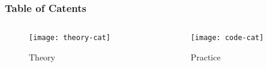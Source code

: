 \begin{frame}[plain]
  \frametitle{Table of Catents}
  \pause
  \begin{columns}
    \begin{column}{0.5\textwidth}
      \begin{figure}[h!]
        \texttt{[image: theory-cat]}
        \caption{\Large\color{orange} Theory}
      \end{figure}
    \end{column}
    \pause
    \begin{column}{0.5\textwidth}
      \begin{figure}[h!]
        \texttt{[image: code-cat]}
        \caption{\Large\color{orange} Practice}
      \end{figure}
    \end{column}
  \end{columns}
\end{frame}

